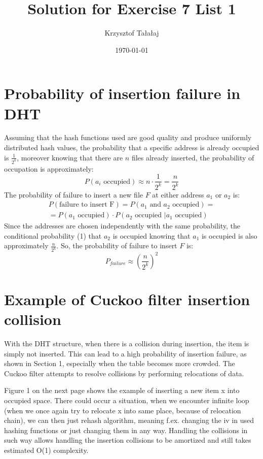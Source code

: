 \documentclass{article}
\title{Solution for Exercise 7 List 1}
\author{Krzysztof Tałałaj}
\date{\today}
\begin{document}
    \maketitle
    \section{Probability of insertion failure in DHT}

    Assuming that the hash functions used are good quality and produce uniformly distributed hash values, the probability that a specific address is already occupied is $\frac{1}{2^k}$, moreover knowing that there are $n$ files already inserted, the probability of occupation is approximately:
    $$P(a_i\text{ occupied}) \approx n \cdot \frac{1}{2^k} = \frac{n}{2^k}$$
    The probability  of failure to insert a new file $F$ at either address $a_1$ or $a_2$ is:
    \begin{gather}
        \nonumber P(\text{failure to insert F}) = P(a_1 \text{ and } a_2 \text{ occupied}) = \\
        = P(a_1 \text{ occupied}) \cdot P(a_2 \text{ occupied } | a_1 \text{    occupied})
    \end{gather}
    Since the addresses are chosen independently with the same probability, the conditional probability (1) that $a_2$ is occupied knowing that $a_1$ is occupied is also approximately $\frac{n}{2^k}$. So, the probability of failure to insert $F$ is:
    \begin{equation}
        P_{failure} \approx \left(\frac{n}{2^k}\right)^2
    \end{equation}

    \section{Example of Cuckoo filter insertion collision}

    With the DHT structure, when there is a collision during insertion, the item is simply not inserted. This can lead to a high probability of insertion failure, as shown in Section 1, especially when the table becomes more crowded. The Cuckoo filter attempts to resolve collisions by performing relocations of data.

    Figure 1 on the next page shows the example of inserting a new item x into occupied space. There could occur a situation, when we encounter infinite loop (when we once again try to relocate x into same place, because of relocation chain), we can then just rehash algorithm, meaning f.ex. changing the iv in used hashing functions or just changing them in any way. Handling the collisions in such way allows handling the insertion collisions to be amortized and still takes estimated O(1) complexity.
\end{document}
